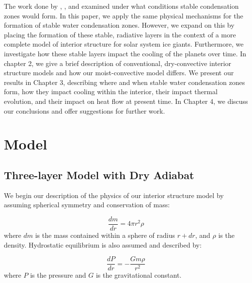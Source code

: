 \documentclass[11pt]{ucscthesisbs}
\begin{document}
The work done by \citep{guillot_1995}, \citep{friedson_2017}, and \citep{leconte_2017} examined under what conditions stable condensation zones would form. In this paper, we apply the same physical mechanisms for the formation of stable water condensation zones. However, we expand on this by placing the formation of these stable, radiative layers in the context of a more complete model of interior structure for solar system ice giants. Furthermore, we investigate how these stable layers impact the cooling of the planets over time. In chapter 2, we give a brief description of conventional, dry-convective interior structure models and how our moist-convective model differs. We present our results in Chapter 3, describing where and when stable water condensation zones form, how they impact cooling within the interior, their impact thermal evolution, and their impact on heat flow at present time. In Chapter 4, we discuss our conclusions and offer suggestions for further work.


\chapter{Model}

\section{Three-layer Model with Dry Adiabat}
\label{Three-layer Model with Dry Adiabat}
We begin our description of the physics of our interior structure model by assuming spherical symmetry and conservation of mass:

\begin{equation}
  \frac{dm}{dr} =4 \pi r^{2}\rho  
\end{equation}
where $dm$ is the mass contained within a sphere of radius $r + dr$, and $\rho$ is the density. Hydrostatic equilibrium is also assumed and described by:

\begin{equation}
  \frac{dP}{dr} = -\frac{Gm\rho}{r^{2}}  
\end{equation}
where $P$ is the pressure and $G$ is the gravitational constant. 
\end{document}
